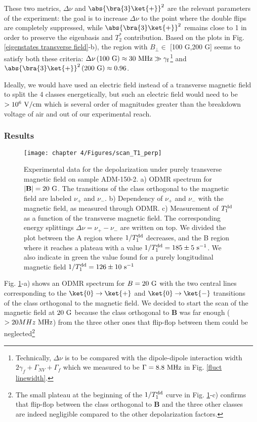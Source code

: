 \documentclass[a4paper, 11pt]{report}
\begin{document}
These two metrics, $\Delta \nu$ and $\abs{\bra{3}\ket{+}}^2$ are the relevant parameters of the experiment: the goal is to increase $\Delta \nu$ to the point where the double flips are completely suppressed, while $\abs{\bra{3}\ket{+}}^2$ remains close to 1 in order to preserve the eigenbasis and $T_2^*$ contribution. Based on the plots in Fig.\ref{eigenstates transverse field}-b), the region with $B_\perp \in$ [100 G,200 G] seems to satisfy both these criteria: $\Delta \nu\,(100\ \rm G) \approx 30\ \rm MHz \gg \gamma_f$\footnote{Technically, $\Delta \nu$ is to be compared with the dipole-dipole interaction width $2\gamma_f+\Gamma_{NV}+\Gamma_f$ which we measured to be $\Gamma=8.8\ \rm MHz$ in Fig. \ref{fluct linewidth}.} and $\abs{\bra{3}\ket{+}}^2\, (200\ \rm G) \approx 0.96$.

Ideally, we would have used an electric field instead of a transverse magnetic field to split the 4 classes energetically, but such an electric field would need to be $> 10^6\ \rm{V/cm}$ which is several order of magnitudes greater than the breakdown voltage of air and out of our experimental reach.

\subsubsection{Results}

\begin{figure}[h!]
\centering
\texttt{[image: chapter 4/Figures/scan\_T1\_perp]}
\caption{Experimental data for the depolarization under purely transverse magnetic field on sample ADM-150-2. a) ODMR spectrum for $|\mathbf{B}|=20\ \rm G$. The transitions of the class orthogonal to the magnetic field are labeled $\nu_+$ and $\nu_-$. b) Dependency of $\nu_+$ and $\nu_-$ with the magnetic field, as measured through ODMR. c) Measurement of $T_1^{\rm dd}$ as a function of the transverse magnetic field. The corresponding energy splittings $\Delta \nu=\nu_+-\nu_-$ are written on top. We divided the plot between the A region where $1/T_1^{\rm dd}$ decreases, and the B region where it reaches a plateau with a value $1/T_1^{\rm dd}=185 \pm 5\ \rm s^{-1}$. We also indicate in green the value found for a purely longitudinal magnetic field $1/T_1^{\rm dd}=126 \pm 10\ \rm s^{-1}$}
\label{champ tranverse exp}
\end{figure}

Fig. \ref{champ tranverse exp}-a) shows an ODMR spectrum for $B=20\ \rm G$ with the two central lines corresponding to the $\ket{0} \to \ket{+}$ and $\ket{0} \to \ket{-}$ transitions of the class orthogonal to the magnetic field. We decided to start the scan of the magnetic field at $20\ \rm G$ because the class orthogonal to $\mathbf{B}$ was far enough ($> 20 MHz\ \rm MHz$) from the three other ones that flip-flop between them could be neglected\footnote{The small plateau at the beginning of the $1/T_1^{\rm dd}$ curve in Fig. \ref{champ tranverse exp}-c) confirms that flip-flop between the class orthogonal to $\mathbf{B}$ and the three other classes are indeed negligible compared to the other depolarization factors.}
\end{document}
